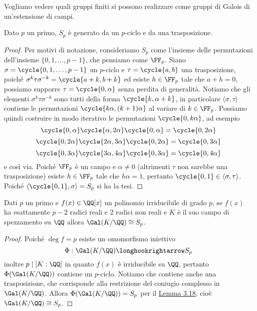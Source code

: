 \documentclass[11pt]{scrartcl}
\begin{document}
Vogliamo vedere quali gruppi finiti si possono realizzare come gruppi di 
Galois di un'estensione di campi. 

\begin{lemma}
    \label{lemma3.18}
    Dato $p$ un primo, $S_p$ è generato da un $p$-ciclo e da una trasposizione.
\end{lemma}

\begin{proof}
    Per motivi di notazione, consideriamo $S_p$ come l'insieme delle permutazioni
    dell'insieme $\{0, 1, \ldots, p - 1\}$, che pensiamo come $\FF_p$. Siano
    $\sigma = \cycle{0, 1, \ldots, p - 1}$ un $p$-ciclo e $\tau = \cycle{a, b}$
    una trasposizione, poiché $\sigma^k\tau\sigma^{-k} = \cycle{a + k, b + k}$
    ed esiste $h \in \FF_p$ tale che $a + h = 0$, possiamo supporre
    $\tau = \cycle{0, \alpha}$ senza perdita di generalità. Notiamo che gli 
    elementi $\sigma^k\tau\sigma^{-k}$ sono tutti della forma $\cycle{k, \alpha + k}$,
    in particolare $\langle\sigma, \tau\rangle$ contiene le permutazioni 
    $\cycle{k\alpha, (k + 1)\alpha}$ al variare di $k \in \FF_p$. Possiamo
    quindi costruire in modo iterativo le permutazioni $\cycle{0, k\alpha}$,
    ad esempio
    \[
        \cycle{0, \alpha}\cycle{\alpha, 2\alpha}\cycle{0, \alpha} = \cycle{0, 2\alpha}
    \]
    \[
        \cycle{0, 2\alpha}\cycle{2\alpha, 3\alpha}\cycle{0, 2\alpha} = \cycle{0, 3\alpha}
    \]
    \[
        \cycle{0, 3\alpha}\cycle{3\alpha, 4\alpha}\cycle{0, 3\alpha} = \cycle{0, 4\alpha}
    \]
    e così via. Poiché $\FF_p$ è un campo e $\alpha \neq 0$ (altrimenti $\tau$ 
    non sarebbe una trasposizione) esiste $h \in \FF_p$ tale che $h\alpha = 1$,
    pertanto $\cycle{0, 1} \in \langle\sigma, \tau\rangle$. Poiché 
    $\langle\cycle{0, 1}, \sigma\rangle = S_p$ si ha la tesi.
\end{proof}

\begin{lemma}
    \label{lemma3.19}
    Dati $p$ un primo e $f(x) \in \QQ[x]$ un polinomio irriducibile di grado
    $p$, se $f(x)$ ha esattamente $p - 2$ radici reali e 2 radici non reali
    e $K$ è il suo campo di spezzamento su $\QQ$ allora $\Gal(K/\QQ) \cong S_p$.
\end{lemma}

\begin{proof}
    Poiché $\deg f = p$ esiste un omomorfismo iniettivo 
    \[
        \Phi: \Gal(K/\QQ) \longhookrightarrow S_p
    \]
    inoltre $p \mid [K:\QQ]$ in quanto $f(x)$ è irriducibile su $\QQ$, pertanto 
    $\Phi(\Gal(K/\QQ))$ contiene un $p$-ciclo. Notiamo che contiene anche una
    trasposizione, che corrisponde alla restrizione del coniugio complesso 
    in $\Gal(K/\QQ)$. Allora $\Phi(\Gal(K/\QQ)) = S_p$ per il 
    \hyperref[lemma3.18]{Lemma 3.18}, cioè $\Gal(K/\QQ) \cong S_p$.
\end{proof}
\end{document}
